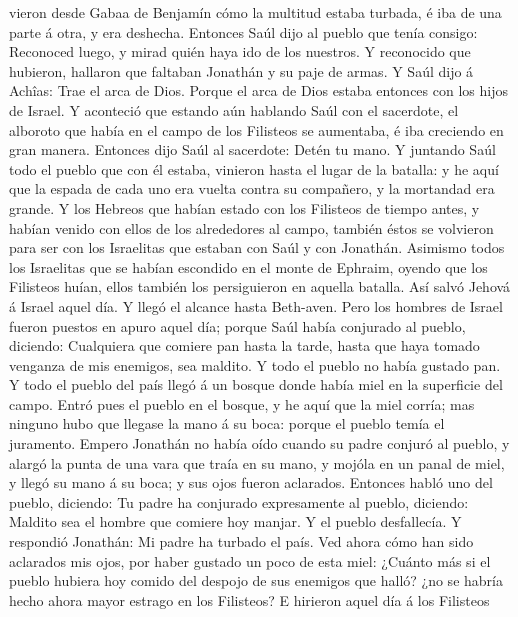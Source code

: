 vieron desde Gabaa de Benjamín cómo la multitud estaba turbada, é iba de
una parte á otra, y era deshecha.  Entonces Saúl dijo al
pueblo que tenía consigo: Reconoced luego, y mirad quién haya ido de los
nuestros. Y reconocido que hubieron, hallaron que faltaban Jonathán y su
paje de armas.  Y Saúl dijo á Achîas: Trae el arca de
Dios. Porque el arca de Dios estaba entonces con los hijos de Israel.
 Y aconteció que estando aún hablando Saúl con el
sacerdote, el alboroto que había en el campo de los Filisteos se
aumentaba, é iba creciendo en gran manera. Entonces dijo Saúl al
sacerdote: Detén tu mano.  Y juntando Saúl todo el pueblo
que con él estaba, vinieron hasta el lugar de la batalla: y he aquí que
la espada de cada uno era vuelta contra su compañero, y la mortandad era
grande.  Y los Hebreos que habían estado con los
Filisteos de tiempo antes, y habían venido con ellos de los alrededores
al campo, también éstos se volvieron para ser con los Israelitas que
estaban con Saúl y con Jonathán.  Asimismo todos los
Israelitas que se habían escondido en el monte de Ephraim, oyendo que
los Filisteos huían, ellos también los persiguieron en aquella batalla.
 Así salvó Jehová á Israel aquel día. Y llegó el alcance
hasta Beth-aven.  Pero los hombres de Israel fueron
puestos en apuro aquel día; porque Saúl había conjurado al pueblo,
diciendo: Cualquiera que comiere pan hasta la tarde, hasta que haya
tomado venganza de mis enemigos, sea maldito. Y todo el pueblo no había
gustado pan.  Y todo el pueblo del país llegó á un bosque
donde había miel en la superficie del campo.  Entró pues
el pueblo en el bosque, y he aquí que la miel corría; mas ninguno hubo
que llegase la mano á su boca: porque el pueblo temía el juramento.
 Empero Jonathán no había oído cuando su padre conjuró al
pueblo, y alargó la punta de una vara que traía en su mano, y mojóla en
un panal de miel, y llegó su mano á su boca; y sus ojos fueron
aclarados.  Entonces habló uno del pueblo, diciendo: Tu
padre ha conjurado expresamente al pueblo, diciendo: Maldito sea el
hombre que comiere hoy manjar. Y el pueblo desfallecía. 
Y respondió Jonathán: Mi padre ha turbado el país. Ved ahora cómo han
sido aclarados mis ojos, por haber gustado un poco de esta miel:
 ¿Cuánto más si el pueblo hubiera hoy comido del despojo
de sus enemigos que halló? ¿no se habría hecho ahora mayor estrago en
los Filisteos?  E hirieron aquel día á los Filisteos
